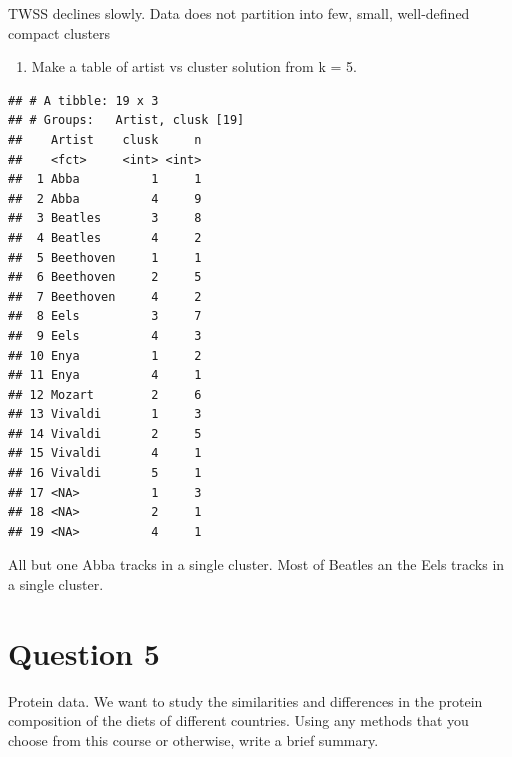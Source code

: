 \documentclass[]{article}
\newenvironment{Shaded}{\begin{snugshade}}{\end{snugshade}}
\newcommand{\DataTypeTok}[1]{\textcolor[rgb]{0.13,0.29,0.53}{#1}}
\newcommand{\DecValTok}[1]{\textcolor[rgb]{0.00,0.00,0.81}{#1}}
\newcommand{\KeywordTok}[1]{\textcolor[rgb]{0.13,0.29,0.53}{\textbf{#1}}}
\newcommand{\NormalTok}[1]{#1}
\newcommand{\OperatorTok}[1]{\textcolor[rgb]{0.81,0.36,0.00}{\textbf{#1}}}
\newcommand{\StringTok}[1]{\textcolor[rgb]{0.31,0.60,0.02}{#1}}
\providecommand{\tightlist}{%
  \setlength{\itemsep}{0pt}\setlength{\parskip}{0pt}}
\begin{document}
TWSS declines slowly. Data does not partition into few, small,
well-defined compact clusters

\begin{enumerate}
\def\labelenumi{\alph{enumi})}
\setcounter{enumi}{1}
\tightlist
\item
  Make a table of artist vs cluster solution from k = 5.
\end{enumerate}

\begin{Shaded}
\end{Shaded}

\begin{verbatim}
## # A tibble: 19 x 3
## # Groups:   Artist, clusk [19]
##    Artist    clusk     n
##    <fct>     <int> <int>
##  1 Abba          1     1
##  2 Abba          4     9
##  3 Beatles       3     8
##  4 Beatles       4     2
##  5 Beethoven     1     1
##  6 Beethoven     2     5
##  7 Beethoven     4     2
##  8 Eels          3     7
##  9 Eels          4     3
## 10 Enya          1     2
## 11 Enya          4     1
## 12 Mozart        2     6
## 13 Vivaldi       1     3
## 14 Vivaldi       2     5
## 15 Vivaldi       4     1
## 16 Vivaldi       5     1
## 17 <NA>          1     3
## 18 <NA>          2     1
## 19 <NA>          4     1
\end{verbatim}

All but one Abba tracks in a single cluster. Most of Beatles an the Eels
tracks in a single cluster.

\newpage

\hypertarget{question-5}{%
\section{Question 5}\label{question-5}}

Protein data. We want to study the similarities and differences in the
protein composition of the diets of different countries. Using any
methods that you choose from this course or otherwise, write a brief
summary.
\end{document}
